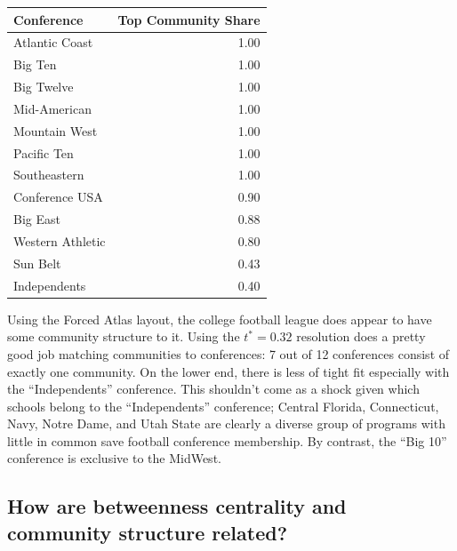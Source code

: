 \documentclass[
]{article}
\begin{document}
\begin{tabular}{l|r}
\hline
Conference & Top Community Share\\
\hline
Atlantic Coast & 1.00\\
\hline
Big Ten & 1.00\\
\hline
Big Twelve & 1.00\\
\hline
Mid-American & 1.00\\
\hline
Mountain West & 1.00\\
\hline
Pacific Ten & 1.00\\
\hline
Southeastern & 1.00\\
\hline
Conference USA & 0.90\\
\hline
Big East & 0.88\\
\hline
Western Athletic & 0.80\\
\hline
Sun Belt & 0.43\\
\hline
Independents & 0.40\\
\hline
\end{tabular}

Using the Forced Atlas layout, the college football league does appear
to have some community structure to it. Using the \(t^*=0.32\)
resolution does a pretty good job matching communities to conferences: 7
out of 12 conferences consist of exactly one community. On the lower
end, there is less of tight fit especially with the ``Independents''
conference. This shouldn't come as a shock given which schools belong to
the ``Independents'' conference; Central Florida, Connecticut, Navy,
Notre Dame, and Utah State are clearly a diverse group of programs with
little in common save football conference membership. By contrast, the
``Big 10'' conference is exclusive to the MidWest.

\hypertarget{how-are-betweenness-centrality-and-community-structure-related}{%
\subsection{How are betweenness centrality and community structure
related?}\label{how-are-betweenness-centrality-and-community-structure-related}}
\end{document}
